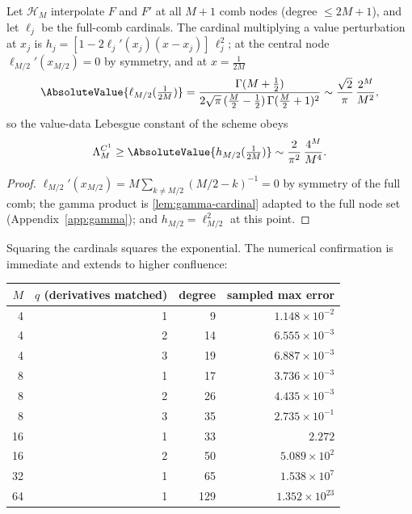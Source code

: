 \begin{theorem}
\label{thm:global-hermite}
Let $\mathcal H_M$ interpolate $F$ and $F'$ at all $M+1$ comb nodes
(degree $\le2M+1$), and let $\ell_j$ be the full-comb cardinals.  The
cardinal multiplying a value perturbation at $x_j$ is
$h_j=[1-2\ell_j'(x_j)(x-x_j)]\,\ell_j^{2}$; at the central node
$\ell_{M/2}'(x_{M/2})=0$ by symmetry, and at $x=\tfrac1{2M}$
\begin{equation}
 \AbsoluteValue{\ell_{M/2}(\tfrac1{2M})}
 =\frac{\Gamma(M+\tfrac12)}
 {2\sqrt\pi\,(\tfrac M2-\tfrac12)\,\Gamma(\tfrac M2+1)^{2}}
 \sim\frac{\sqrt2}{\pi}\,\frac{2^{M}}{M^{2}},
 \label{eq:full-central-cardinal}
\end{equation}
so the value-data Lebesgue constant of the scheme obeys
\begin{equation}
 \Lambda^{C^{1}}_M
 \ge\AbsoluteValue{h_{M/2}(\tfrac1{2M})}
 \sim\frac{2}{\pi^{2}}\,\frac{4^{M}}{M^{4}}.
 \label{eq:hermite-square}
\end{equation}
\end{theorem}

\begin{proof}
$\ell_{M/2}'(x_{M/2})=M\sum_{k\ne M/2}(M/2-k)^{-1}=0$ by symmetry of
the full comb; the gamma product is \cref{lem:gamma-cardinal} adapted
to the full node set (Appendix~\ref{app:gamma}); and $h_{M/2}=\ell_{M/2}^{2}$
at this point.
\end{proof}

Squaring the cardinals squares the exponential.  The numerical
confirmation is immediate and extends to higher confluence:

\begin{center}
\small
\begin{tabular}{rrrr}
\toprule
$M$ & $q$ (derivatives matched) & degree & sampled max error \\
\midrule
4  & 1 & 9   & $1.148\times10^{-2}$ \\
4  & 2 & 14  & $6.555\times10^{-3}$ \\
4  & 3 & 19  & $6.887\times10^{-3}$ \\
8  & 1 & 17  & $3.736\times10^{-3}$ \\
8  & 2 & 26  & $4.435\times10^{-3}$ \\
8  & 3 & 35  & $2.735\times10^{-1}$ \\
16 & 1 & 33  & $2.272$ \\
16 & 2 & 50  & $5.089\times10^{2}$ \\
32 & 1 & 65  & $1.538\times10^{7}$ \\
64 & 1 & 129 & $1.352\times10^{23}$ \\
\bottomrule
\end{tabular}
\label{tab:full-hermite}
\end{center}


